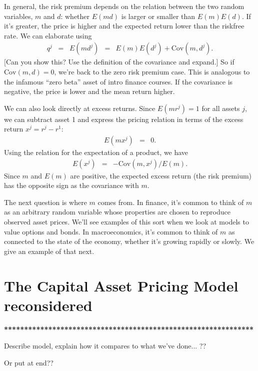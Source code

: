 \documentclass[11pt]{article}
\begin{document}
In general, the risk premium depends on the relation between
the two random variables, $m$ and $d$:
whether $E(md)$ is larger or smaller than $E(m) E(d)$.
If it's greater, the price is higher and the expected return lower
than the riskfree rate.
We can elaborate using
\begin{eqnarray*}
    q^j \;\;=\;\;    E(md^j) &=& E(m) E(d^j) + \mbox{Cov}(m,d^j).
\end{eqnarray*}
[Can you show this?  Use the definition of the covariance and expand.]
So if $\mbox{Cov}(m,d) =0$, we're back to the zero risk premium case.
This is analogous to the infamous ``zero beta'' asset of intro finance courses.
If the covariance is negative, the price is lower and the mean return higher.

We can also look directly at excess returns.  Since $ E(mr^j) = 1$ for all assets $j$,
we can subtract asset 1 and express the pricing relation in terms
of the excess return $x^j = r^j - r^1 $:
\begin{eqnarray*}
    E( m x^j) &=& 0.
\end{eqnarray*}
Using the relation for the expectation of a product, we have
\begin{eqnarray*}
    E(x^j) &=& - \mbox{Cov}(m,x^j)/E(m) .
\end{eqnarray*}
Since $m$ and $E(m)$ are positive, the expected excess return
(the risk premium) has the opposite sign as the covariance with $m$.

The next question is where $m$ comes from.
In finance, it's common to think of $m$ as an arbitrary random variable
whose properties are chosen to reproduce observed asset prices.
We'll see examples of this sort when we look at models to value options and bonds.
In macroeconomics, it's common to think of $m$ as connected to
the state of the economy, whether it's growing rapidly or slowly.
We give an example of that next.


\section{The Capital Asset Pricing Model reconsidered}

{\bf ***************************************************************}

Describe model, explain how it compares to what we've done...  ??

Or put at end??
\end{document}

